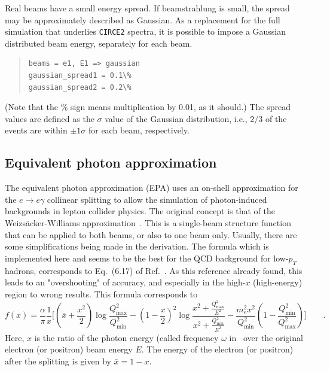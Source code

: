 \documentclass[12pt]{book}
\newcommand{\ttt}[1]{\texttt{#1}}
\begin{document}
Real beams have a small energy spread.  If beamstrahlung is small, the spread
may be approximately described as Gaussian.  As a replacement for the full
simulation that underlies \ttt{CIRCE2} spectra, it is possible to
impose a Gaussian distributed beam energy, separately for each beam.
\begin{quote}
\begin{footnotesize}
\begin{Verbatim}
beams = e1, E1 => gaussian
gaussian_spread1 = 0.1\%
gaussian_spread2 = 0.2\%
\end{Verbatim}
\end{footnotesize}%
\end{quote}
(Note that the \% sign means multiplication by 0.01, as it should.)  The
spread values are defined as the $\sigma$ value of the Gaussian distribution,
i.e., $2/3$ of the events are within $\pm 1\sigma$ for each beam,
respectively.


\subsection{Equivalent photon approximation}
\label{sec:epa}

The equivalent photon approximation (EPA) uses an on-shell approximation for
the $e \to e\gamma$ collinear splitting to allow the simulation of
photon-induced backgrounds in lepton collider physics. The original
concept is that of the Weizs\"acker-Williams
approximation~\cite{vonWeizsacker:1934sx,Williams:1934ad,Budnev:1974de}. This
is a single-beam structure function that can be applied to both beams,
or also to one beam only. Usually, there are some simplifications
being made in the derivation. The formula which is implemented here
and seems to be the best for the QCD background for low-$p_T$ hadrons,
corresponds to Eq.~(6.17) of Ref.~\cite{Budnev:1974de}. As this
reference already found, this leads to an "overshooting" of accuracy,
and especially in the high-$x$ (high-energy) region to wrong
results. This formula corresponds to
\begin{equation}
  \label{eq:budnev_617}
  f(x) = \frac{\alpha}{\pi} \frac{1}{x} \biggl[ \left( \bar{x} +
    \frac{x^2}{2} \right) \log
    \frac{Q^2_{\text{max}}}{Q^2_{\text{min}}}
    - \left( 1 - \frac{x}{2} \right)^2
    \log \frac{x^2 + \tfrac{Q^2_{\text{max}}}{E^2}}{x^2 +
      \tfrac{Q^2_{\text{min}}}{E^2}}
    - \frac{m_e^2 x^2}{Q^2_{\text{min}}} \left( 1 -
    \frac{Q^2_{\text{min}}}{Q^2_{\text{max}}} \right) \biggr] \qquad .
\end{equation}
Here, $x$ is the ratio of the photon energy (called frequency $\omega$
in~\cite{Budnev:1974de} over the original electron (or positron) beam
energy $E$. The energy of the electron (or positron) after the
splitting is given by $\bar{x} = 1-x$.
\end{document}
